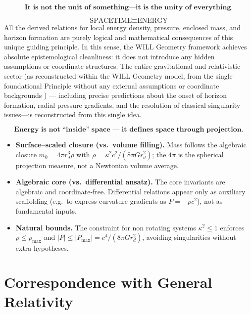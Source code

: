 \documentclass[12pt, a4paper]{article}
\begin{document}
\begin{tcolorbox}[colback=gray!5, colframe=black!80!black, title=WILL]
\[
\boxed{
\textbf{It is not the unit of something—it is the unity of everything.}
}
\]
\end{tcolorbox}


\[
\boxed{\text{SPACETIME} \equiv \text{ENERGY}}
\]
All the derived relations for local energy density, pressure, enclosed mass, and horizon formation are purely logical and mathematical consequences of this unique guiding principle. In this sense, the WILL Geometry framework achieves absolute epistemological cleanliness: it does not introduce any hidden assumptions or coordinate structures. The entire gravitational and relativistic sector (as reconstructed within the WILL Geometry model, from the single foundational Principle without any external assumptions or coordinate backgrounds ) — including precise predictions about the onset of horizon formation, radial pressure gradients, and the resolution of classical singularity issues—is reconstructed from this single idea.


\begin{tcolorbox}[colback=gray!5, colframe=black!80!black, title=Meaning]
\[
\textbf{Energy is not “inside” space — it defines space through projection.}
\]
\end{tcolorbox}


\begin{itemize}
\item \textbf{Surface–scaled closure (vs.\ volume filling).} 
Mass follows the algebraic closure $m_0=4\pi r_d^3\rho$ with $\rho=\kappa^2 c^2/(8\pi G r_d^2)$; the $4\pi$ is the spherical projection measure, not a Newtonian volume average.

\item \textbf{Algebraic core (vs.\ differential ansatz).}
The core invariants are algebraic and coordinate-free. Differential relations appear only as auxiliary scaffolding (e.g.\ to express curvature gradients as $P=-\rho c^2$), not as fundamental inputs.

\item \textbf{Natural bounds.}
The constraint for non rotating systems $\kappa^2\le 1$ enforces $\rho\le\rho_{\max}$ and $|P|\le |P_{\max}|=c^4/(8\pi G r_d^2)$, avoiding singularities without extra hypotheses.
\end{itemize}


\section{Correspondence with General Relativity}
\end{document}
